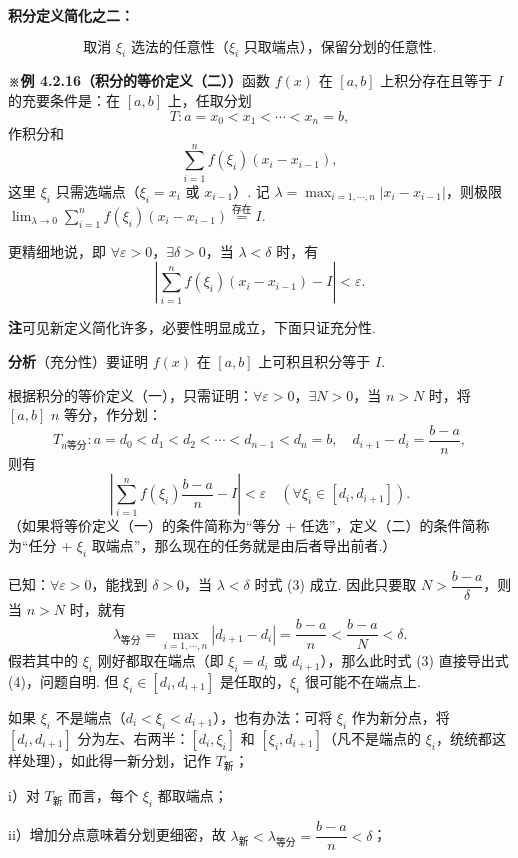 \documentclass[UTF8, 12pt, fontset=fandol, oneside]{ctexart}
\begin{document}
\noindent\textbf{积分定义简化之二：}

\[
\text{取消 $\xi_i$ 选法的任意性（$\xi_i$ 只取端点），保留分划的任意性.}
\]

\noindent\textbf{※例 4.2.16（积分的等价定义（二））}\quad 函数 $f(x)$ 在 $[a,b]$ 上积分存在且等于 $I$ 的充要条件是：在 $[a,b]$ 上，任取分划
\[
T:a=x_0<x_1<\cdots<x_n=b,
\tag{1}
\]
作积分和
\[
\sum_{i=1}^n f(\xi_i)(x_i-x_{i-1}),
\tag{2}
\]
这里 $\xi_i$ 只需选端点（$\xi_i=x_i$ 或 $x_{i-1}$）. 记 $\lambda=\max_{i=1,\cdots,n}|x_i-x_{i-1}|$，则极限 $\lim_{\lambda\to0}\sum_{i=1}^n f(\xi_i)(x_i-x_{i-1})\stackrel{\text{存在}}{=}I$.

更精细地说，即 $\forall\varepsilon>0$，$\exists\delta>0$，当 $\lambda<\delta$ 时，有
\[
\left|\sum_{i=1}^n f(\xi_i)(x_i-x_{i-1})-I\right|<\varepsilon.
\tag{3}
\]

\noindent\textbf{注}\quad 可见新定义简化许多，必要性明显成立，下面只证充分性.

\noindent\textbf{分析}\quad （充分性）要证明 $f(x)$ 在 $[a,b]$ 上可积且积分等于 $I$.

根据积分的等价定义（一），只需证明：$\forall\varepsilon>0$，$\exists N>0$，当 $n>N$ 时，将 $[a,b]$ $n$ 等分，作分划：
\[
T_{n\text{等分}}:a=d_0<d_1<d_2<\cdots<d_{n-1}<d_n=b,\quad d_{i+1}-d_i=\frac{b-a}{n},
\]
则有
\[
\left|\sum_{i=1}^n f(\xi_i)\frac{b-a}{n}-I\right|<\varepsilon\quad(\forall\xi_i\in[d_i,d_{i+1}]).
\tag{4}
\]
（如果将等价定义（一）的条件简称为“等分 + 任选”，定义（二）的条件简称为“任分 + $\xi_i$ 取端点”，那么现在的任务就是由后者导出前者.）

已知：$\forall\varepsilon>0$，能找到 $\delta>0$，当 $\lambda<\delta$ 时式 (3) 成立. 因此只要取 $N>\dfrac{b-a}{\delta}$，则当 $n>N$ 时，就有
\[
\lambda_{\text{等分}}=\max_{i=1,\cdots,n}|d_{i+1}-d_i|=\frac{b-a}{n}<\frac{b-a}{N}<\delta.
\]
假若其中的 $\xi_i$ 刚好都取在端点（即 $\xi_i=d_i$ 或 $d_{i+1}$），那么此时式 (3) 直接导出式 (4)，问题自明. 但 $\xi_i\in[d_i,d_{i+1}]$ 是任取的，$\xi_i$ 很可能不在端点上.

如果 $\xi_i$ 不是端点（$d_i<\xi_i<d_{i+1}$），也有办法：可将 $\xi_i$ 作为新分点，将 $[d_i,d_{i+1}]$ 分为左、右两半：$[d_i,\xi_i]$ 和 $[\xi_i,d_{i+1}]$（凡不是端点的 $\xi_i$，统统都这样处理），如此得一新分划，记作 $T_{\text{新}}$；

i）对 $T_{\text{新}}$ 而言，每个 $\xi_i$ 都取端点；

ii）增加分点意味着分划更细密，故 $\lambda_{\text{新}}<\lambda_{\text{等分}}=\dfrac{b-a}{n}<\delta$；
\end{document}
